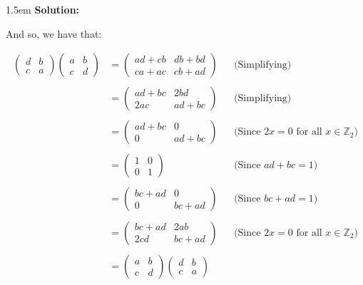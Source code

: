 \documentclass{article}
\newenvironment{solution}{
	\vspace{.5em}
	\par
	\begin{adjustwidth}{1.5em}{}
	\textbf{{Solution:}}
	\par
	\vspace{.5em}
}{
	\vspace{1em}
	\end{adjustwidth}
	\setcounter{step}{0}
}
\newcounter{step}
\begin{document}
\begin{solution}
	And so, we have that:

	\begin{align*}
		\boxed{\begin{pmatrix}
			d & b \\
			c & a
		\end{pmatrix}
		\begin{pmatrix}
			a & b \\
			c & d
		\end{pmatrix}}
		&= \begin{pmatrix}
			ad + cb & db + bd \\
			ca + ac & cb + ad
		\end{pmatrix}
		&&\text{(Simplifying)} \\\\
		&= \begin{pmatrix}
			ad + bc & 2bd \\
			2ac & ad + bc
		\end{pmatrix}
		&&\text{(Simplifying)} \\\\
		&= \begin{pmatrix}
			ad + bc & 0 \\
			0 & ad + bc
		\end{pmatrix}
		&&\text{(Since $2x = 0$ for all $x \in \mathbb{Z}_{2}$)} \\\\
		&= \boxed{\begin{pmatrix}
			1 & 0 \\
			0 & 1
		\end{pmatrix}}
		&&\text{(Since $ad + bc = 1$)} \\\\
		&= \begin{pmatrix}
			bc + ad & 0 \\
			0 & bc + ad
		\end{pmatrix}
		&&\text{(Since $bc + ad = 1$)} \\\\
		&= \begin{pmatrix}
			bc + ad & 2ab \\
			2cd & bc + ad
		\end{pmatrix}
		&&\text{(Since $2x = 0$ for all $x \in \mathbb{Z}_{2}$)} \\\\
		&= \boxed{\begin{pmatrix}
			a & b \\
			c & d
		\end{pmatrix}
		\begin{pmatrix}
			d & b \\
			c & a
		\end{pmatrix}} \\\\
	\end{align*}


\end{solution}
\end{document}
